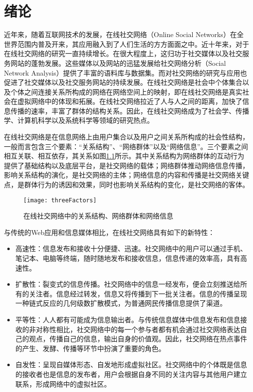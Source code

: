 \chapter{绪论}
\label{chap01}
近年来，随着互联网技术的发展，在线社交网络（Online Social Networks）在全世界范围内普及开来，其应用融入到了人们生活的方方面面之中。近十年来，对于在线社交网络的研究一直持续增长。在很大程度上，这归功于社交媒体以及社交服务网站的蓬勃发展。这些媒体以及网站的迅猛发展给社交网络分析（Social Network Analysis）提供了丰富的语料库与数据集。而对社交网络的研究与应用也促进了社交媒体以及社交服务网站的持续发展。在线社交网络是社会中个体集合以及个体之间连接关系所构成的网络在网络空间上的映射，即在线社交网络是真实社会在虚拟网络中的体现和拓展。在线社交网络拉近了人与人之间的距离，加快了信息传播的速率，丰富了群体的结构关系。因此，在线社交网络成为了社会学、传播学、计算机科学以及系统科学等领域的研究热点。

在线社交网络是在信息网络上由用户集合以及用户之间关系所构成的社会性结构，一般而言包含三个要素：“关系结构”、“网络群体”以及“网络信息”。三个要素之间相互关联、相互依存，其关系如图\ref{fig:threeFactors}所示。其中关系结构为网络群体的互动行为提供了基础结构以及底层平台，是社交网络的载体；网络群体推动网络信息传播，影响关系结构的演化，是社交网络的主体；网络信息的内容和传播是社交网络关键点，是群体行为的诱因和效果，同时也影响关系结构的变化，是社交网络的客体。

\begin{figure}[!ht]
    \centering
    \texttt{[image: threeFactors]}
    \caption{在线社交网络中的关系结构、网络群体和网络信息}
    \label{fig:threeFactors}
\end{figure}

与传统的Web应用和信息媒体相比，在线社交网络具有如下的新特性：
\begin{itemize}
	\item 高速性：信息发布和接收十分便捷、迅速。社交网络中的用户可以通过手机、笔记本、电脑等终端，随时随地发布和接收信息，信息传递的效率高，具有高速性。
	\item 扩散性：裂变式的信息传播。社交网络中的信息一经发布，便会立刻推送给所有的关注者。信息经过转发，信息又将传播到下一批关注者。信息的传播呈现一种链式反应的几何级数扩散模式，为普通网民传播信息提供了渠道。
	\item 平等性：人人都有可能成为信息输出者。与传统信息媒体中信息发布和信息接收的非对称性相比，社交网络中的每一个参与者都有机会通过社交网络表达自己的观点，传播自己的信息，输出自身的价值观。因此，社交网络在热点事件的产生、发酵、传播等环节中扮演了重要的角色。
	\item 自发性：呈现自媒体形态、自发地形成虚拟社区。社交网络中的个体既是信息的接收者也是信息的发布者，用户会根据自身不同的关注内容与其他用户建立联系，形成网络中的虚拟社区。
\end{itemize}

